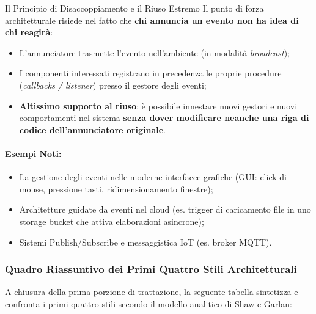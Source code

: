 \documentclass[12pt]{extarticle}
\begin{document}
\begin{cbox}{Il Principio di Disaccoppiamento e il Riuso Estremo}
\noindent Il punto di forza architetturale risiede nel fatto che \textbf{chi annuncia un evento non ha idea di chi reagirà}:
\begin{itemize}
    \item L'annunciatore trasmette l'evento nell'ambiente (in modalità \textit{broadcast});
    \item I componenti interessati registrano in precedenza le proprie procedure (\textit{callbacks / listener}) presso il gestore degli eventi;
    \item \textbf{Altissimo supporto al riuso}: è possibile innestare nuovi gestori e nuovi comportamenti nel sistema \textbf{senza dover modificare neanche una riga di codice dell'annunciatore originale}.
\end{itemize}
\end{cbox}

\paragraph{Esempi Noti:}
\begin{itemize}
    \item La gestione degli eventi nelle moderne interfacce grafiche (GUI: click di mouse, pressione tasti, ridimensionamento finestre);
    \item Architetture guidate da eventi nel cloud (es. trigger di caricamento file in uno storage bucket che attiva elaborazioni asincrone);
    \item Sistemi Publish/Subscribe e messaggistica IoT (es. broker MQTT).
\end{itemize}

\subsubsection{Quadro Riassuntivo dei Primi Quattro Stili Architetturali}

\noindent A chiusura della prima porzione di trattazione, la seguente tabella sintetizza e confronta i primi quattro stili secondo il modello analitico di Shaw e Garlan:
\end{document}
